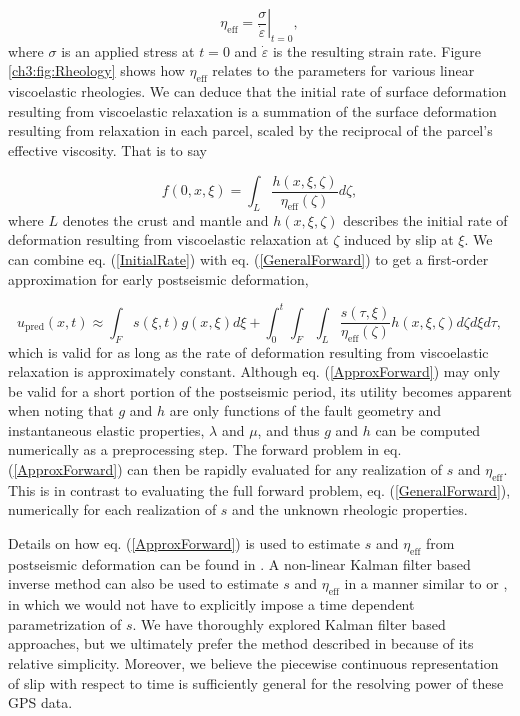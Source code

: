 \begin{equation}
  \eta_\mathrm{eff} = \left.\frac{\sigma}{\dot{\varepsilon}}\right|_{t=0},
\end{equation}
where $\sigma$ is an applied stress at $t=0$ and $\dot\varepsilon$ is the resulting strain rate.  Figure \ref{ch3:fig:Rheology} shows how $\eta_\mathrm{eff}$ relates to the parameters for various linear viscoelastic rheologies.   We can deduce that the initial rate of surface deformation resulting from viscoelastic relaxation is a summation of the surface deformation resulting from relaxation in each parcel, scaled by the reciprocal of the parcel's effective viscosity.  That is to say   

\begin{equation}\label{InitialRate}
  f(0,x,\xi) = \int_L \frac{h(x,\xi,\zeta)}{\eta_\mathrm{eff}(\zeta)} d\zeta, 
\end{equation}
where $L$ denotes the crust and mantle and $h(x,\xi,\zeta)$ describes the initial rate of deformation resulting from viscoelastic relaxation at $\zeta$ induced by slip at $\xi$. We can combine eq. (\ref{InitialRate}) with eq. (\ref{GeneralForward}) to get a first-order approximation for early postseismic deformation,

\begin{equation}\label{ApproxForward}
  u_\mathrm{pred}(x,t) \approx \int_F s(\xi,t)g(x,\xi)d\xi + 
           \int_0^t\int_F\int_L \frac{s(\tau,\xi)}{\eta_\mathrm{eff}(\zeta)} h(x,\xi,\zeta) d\zeta d\xi d\tau,
\end{equation}
which is valid for as long as the rate of deformation resulting from viscoelastic relaxation is approximately constant.  Although eq. (\ref{ApproxForward}) may only be valid for a short portion of the postseismic period, its utility becomes apparent when noting that $g$ and $h$ are only functions of the fault geometry and instantaneous elastic properties, $\lambda$ and $\mu$, and thus $g$ and $h$ can be computed numerically as a preprocessing step.  The forward problem in eq. (\ref{ApproxForward}) can then be rapidly evaluated for any realization of $s$ and $\eta_{\mathrm{eff}}$.  This is in contrast to evaluating the full forward problem, eq. (\ref{GeneralForward}), numerically for each realization of $s$ and the unknown rheologic properties. 

Details on how eq. (\ref{ApproxForward}) is used to estimate $s$ and $\eta_\mathrm{eff}$ from postseismic deformation can be found in \citet{Hines2016}.  A non-linear Kalman filter based inverse method can also be used to estimate $s$ and $\eta_{\mathrm{eff}}$ in a manner similar to \citet{Segall1997} or \citet{McGuire2003}, in which we would not have to explicitly impose a time dependent parametrization of $s$. We have thoroughly explored Kalman filter based approaches, but we ultimately prefer the method described in \citet{Hines2016} because of its relative simplicity. Moreover, we believe the piecewise continuous representation of slip with respect to time is sufficiently general for the resolving power of these GPS data.

